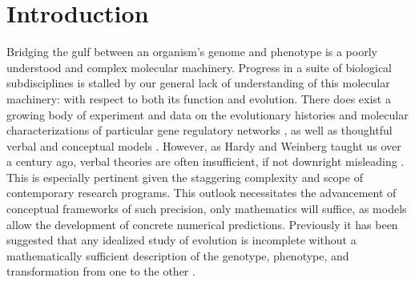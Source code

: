\documentclass{article}
\newcommand{\1}{\mathbbm{1}}
\begin{document}
\section*{Introduction}

Bridging the gulf between an organism's genome and phenotype is a poorly understood and complex molecular machinery. Progress in a suite of biological subdisciplines is stalled by our general lack of understanding of this molecular machinery: with respect to both its function and evolution. There does exist a growing body of experiment and data on the evolutionary histories and molecular characterizations of particular gene regulatory networks \citep{jaeger2011gap, davidson2006gene, israel2016comparative}, as well as thoughtful verbal and conceptual models \citep{true2001developmental, gwagner1, weiss2000phenogenetic, edelman2001degeneracy}. However, as Hardy and Weinberg taught us over a century ago, verbal theories are often insufficient, if not downright misleading \citep{hardy1908mendelian, weinberg1908vererbungsgesetze, servedio2014not}. This is especially pertinent given the staggering complexity and scope of contemporary research programs. This outlook necessitates the advancement of conceptual frameworks of such precision, only mathematics will suffice, as models allow the development of concrete numerical predictions. Previously it has been suggested that any idealized study of evolution is incomplete without a mathematically sufficient description of the genotype, phenotype, and transformation from one to the other \citep{Lewontin1974genetic}.%

\end{document}

